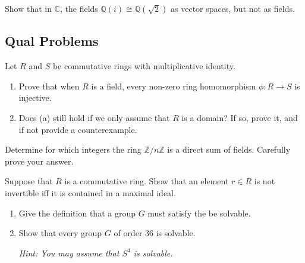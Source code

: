 \begin{problem}[Hungerford 5.1.16]
Show that in $\mathbb{C}$, the fields $\mathbb{Q}(i) \cong \mathbb{Q}(\sqrt 2)$ as vector spaces, but not as fields.
\label{prob:1.1}
\end{problem}

\newpage
\subsection{Qual Problems}

\begin{problem}
Let $R$ and $S$ be commutative rings with multiplicative identity.

\begin{enumerate}
    \item Prove that when $R$ is a field, every non-zero ring homomorphism $\phi: R\to S$ is injective.
    \item Does (a) still hold if we only assume that $R$ is a domain? If so, prove it, and if not provide a counterexample.
\end{enumerate}
\end{problem}

\begin{problem}
Determine for which integers the ring $\mathbb{Z}/n\mathbb{Z}$ is a direct sum of fields. Carefully prove your answer.
\end{problem}

\begin{problem}
Suppose that $R$ is a commutative ring. Show that an element $r\in R$ is not invertible iff it is contained in a maximal ideal.
\end{problem}

\begin{problem}\hfill

\begin{enumerate}
    \item Give the definition that a group $G$ must satisfy the be solvable.
    \item Show that every group $G$ of order 36 is solvable.
    
    \textit{Hint: You may assume that $S^4$ is solvable.}
\end{enumerate}
\end{problem}
